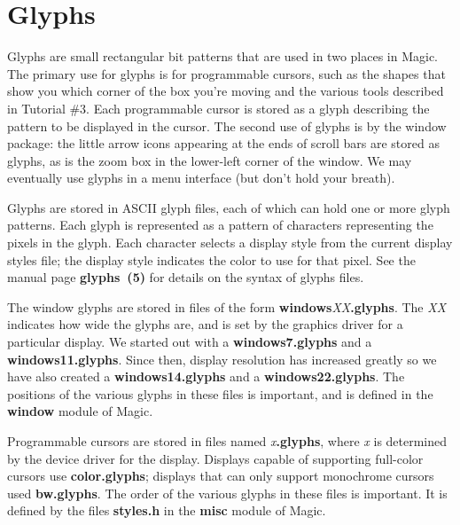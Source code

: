 \documentclass[letterpaper,twoside,12pt]{article}
\begin{document}
\section{Glyphs}

Glyphs are small rectangular bit patterns that are used in two
places in Magic.  The primary use for glyphs is for programmable
cursors, such as the shapes that show you which corner of the
box you're moving and the various tools described in Tutorial \#3.
Each programmable cursor is stored as a glyph describing the
pattern to be displayed in the cursor.  The second use of glyphs
is by the window package:  the little arrow icons appearing at the
ends of scroll bars are stored as glyphs, as is the zoom box in
the lower-left corner of the window.  We may eventually use glyphs
in a menu interface (but don't hold your breath).

Glyphs are stored in ASCII glyph files, each of which can hold
one or more glyph patterns.  Each glyph is represented as a
pattern of characters representing the pixels in the glyph.
Each character selects a display style from the current
display styles file;  the display style indicates the color to use for
that pixel.  See the manual page {\bfseries glyphs~(5)}
for details on the syntax of glyphs files.  

The window glyphs are stored in files of the form
{\bfseries windows}{\itshape XX}{\bfseries .glyphs}.
The {\itshape XX} indicates how wide the glyphs are, and is set by the graphics
driver for a particular display.  We started out with a {\bfseries windows7.glyphs}
and a {\bfseries windows11.glyphs}.   Since then, display resolution has 
increased greatly so we have also created a {\bfseries windows14.glyphs} and a
{\bfseries windows22.glyphs}.  The positions of the various glyphs in
these files is important, and is defined in the {\bfseries window} module of
Magic.

Programmable cursors are stored in files named
{\itshape x}{\bfseries .glyphs}, where {\itshape x} is determined by
the device driver
for the display.  Displays capable of supporting full-color cursors
use {\bfseries color.glyphs};  displays that can only support monochrome
cursors used {\bfseries bw.glyphs}.  The order of the various glyphs
in these files is important.  It is defined by the files {\bfseries styles.h}
in the {\bfseries misc} module of Magic.
\end{document}
